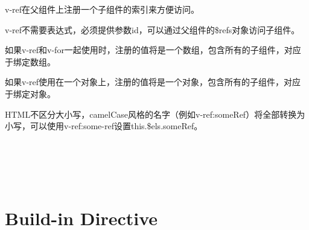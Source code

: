 v-ref在父组件上注册一个子组件的索引来方便访问。

v-ref不需要表达式，必须提供参数id，可以通过父组件的\$refs对象访问子组件。

\begin{compactitem}
\item 如果v-ref和v-for一起使用时，注册的值将是一个数组，包含所有的子组件，对应于绑定数组。
\item 如果v-ref使用在一个对象上，注册的值将是一个对象，包含所有的子组件，对应于绑定对象。
\end{compactitem}

HTML不区分大小写，camelCase风格的名字（例如v-ref:someRef）将全部转换为小写，可以使用v-ref:some-ref设置this.\$els.someRef。










\begin{lstlisting}[language=JavaScript]

\end{lstlisting}




\begin{lstlisting}[language=JavaScript]

\end{lstlisting}




\begin{lstlisting}[language=JavaScript]

\end{lstlisting}




\begin{lstlisting}[language=JavaScript]

\end{lstlisting}




\begin{lstlisting}[language=JavaScript]

\end{lstlisting}




\begin{lstlisting}[language=JavaScript]

\end{lstlisting}


\chapter{Build-in Directive}


